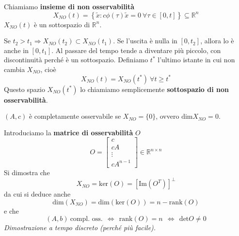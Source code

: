 \documentclass[10pt,a4paper]{book}
\begin{document}
Chiamiamo \textbf{insieme di non osservabilità}
\begin{equation*}
X_{NO}( t) =\left\{\tilde{x} :c\phi ( \tau )\tilde{x} =0\ \forall \tau \in [ 0,t]\right\} \subseteq \mathbb{R}^{n}
\end{equation*}
$X_{NO}( t)$ è un sottospazio di $\mathbb{R}^{n}$.

Se $t_{2}  >t_{1} \Rightarrow X_{NO}( t_{2}) \subset X_{NO}( t_{1})$. Se l'uscita è nulla in $[ 0,t_{2}]$, allora lo è anche in $[ 0,t_{1}]$. Al passare del tempo tende a diventare più piccolo, con discontinuità perché è un sottospazio. Definiamo $t^{*}$ l'ultimo istante in cui non cambia $X_{NO}$, cioè
\begin{equation*}
X_{NO}( t) =X_{NO}\left( t^{*}\right) \ \forall t\geqslant t^{*}
\end{equation*}
Questo spazio $X_{NO}\left( t^{*}\right)$ lo chiamiamo semplicemente \textbf{sottospazio di non osservabilità}.
\begin{definition}
$( A,c)$ è completamente osservabile se $X_{NO} =\{0\}$, ovvero $\mathrm{dim} X_{NO} =0$.
\end{definition}
Introduciamo la \textbf{matrice di osservabilità} $O$
\begin{equation*}
\boxed{O=\begin{bmatrix}
c\\
cA\\
\vdots \\
cA^{n-1}
\end{bmatrix} \in \mathbb{R}^{n\times n}}
\end{equation*}
Si dimostra che
\begin{equation*}
X_{NO} =\mathrm{ker}( O) =\left[\mathrm{Im}\left( O^{T}\right)\right]^{\perp }
\end{equation*}
da cui si deduce anche
\begin{equation*}
\mathrm{dim}( X_{NO}) =\mathrm{dim}(\mathrm{ker}( O)) =n-\mathrm{rank}( O)
\end{equation*}
e che
\begin{equation*}
( A,b) \ \text{compl. oss.} \ \ \Leftrightarrow \ \ \mathrm{rank}( O) =n\ \ \Leftrightarrow \ \ \mathrm{det} O\neq 0
\end{equation*}
\textit{Dimostrazione a tempo discreto (perché più facile).}
\end{document}
